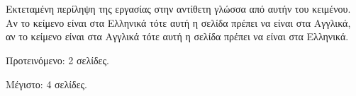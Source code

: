 \chapter*{\cseextabstract}
\addstarredchapter{\cseextabstract} %
\makecseextabstract


\noindent Εκτεταμένη περίληψη της εργασίας στην αντίθετη γλώσσα από αυτήν του κειμένου.
Αν το κείμενο είναι στα Ελληνικά τότε αυτή η σελίδα πρέπει να είναι στα Αγγλικά, αν το κείμενο είναι στα Αγγλικά τότε αυτή η σελίδα πρέπει να είναι στα Ελληνικά.

\bigskip

\noindent Προτεινόμενο: 2 σελίδες.

\noindent Μέγιστο: 4 σελίδες.